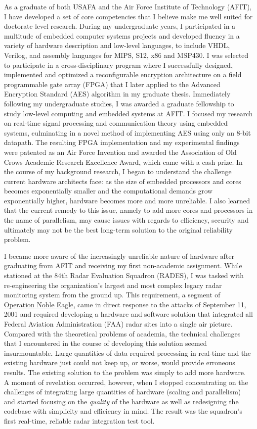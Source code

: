 \documentclass{article}
\begin{document}
As a graduate of both USAFA and the Air Force Institute of Technology
(AFIT), I have developed a set of core competencies that I believe make me well
suited for doctorate level research. During my undergraduate years, I
participated in a multitude of embedded computer systems projects and developed fluency in a
variety of hardware description and low-level languages, to include VHDL,
Verilog, and assembly languages for MIPS, S12, x86 and MSP430. I was
selected to participate in a cross-disciplinary
program where I successfully designed, implemented and optimized a
reconfigurable encryption architecture on a field programmable gate array
(FPGA) that I later applied to the Advanced Encryption Standard (AES) algorithm
in my graduate thesis. Immediately following my undergraduate studies, I was
awarded a graduate fellowship to study low-level computing and embedded systems
at AFIT. I focused my research on real-time
signal processing and communication theory using embedded systems, culminating
in a novel method of implementing AES using only an 8-bit datapath.  The
resulting FPGA implementation and my experimental findings were patented as an Air Force
Invention and awarded the Association of Old Crows Academic Research Excellence
Award, which came with a cash prize. In the course of my background research, I
began to understand the challenge current hardware architects face: as the size
of embedded processors and cores becomes exponentially smaller and the
computational demands grow exponentially higher, hardware becomes more and more 
unreliable. I also learned that the current remedy to this issue, namely to add
more cores and processors in the name of parallelism, may cause issues with
regards to efficiency, security and ultimately may not be the best long-term
solution to the original reliability problem.

I became more aware of the increasingly unreliable nature of hardware after
graduating from AFIT and receiving my first non-academic assignment. While
stationed at the 84th Radar Evaluation Squadron (RADES), I was tasked with
re-engineering the organization's largest and most complex legacy radar
monitoring system from the ground up. This requirement, a segment of
\href{http://en.wikipedia.org/wiki/Operation_Noble_Eagle}{Operation Noble
Eagle}, came in direct response to the attacks of September 11, 2001 and
required developing a hardware and software solution that integrated all
Federal Aviation Administration (FAA) radar sites into a single air picture.
Compared with the theoretical problems of academia, the technical challenges that I
encountered in the course of developing this solution seemed insurmountable.
Large quantities of data required processing in real-time and the existing
hardware just could not keep up, or worse, would provide erroneous results. The
existing solution to the problem was simply to add more hardware. A moment of
revelation occurred, however, when I
stopped concentrating on the challenges of integrating large quantities of hardware (scaling and parallelism) and
started focusing on the \emph{quality} of the hardware as well as redesigning the
codebase with simplicity and efficiency in mind. The result was the squadron's
first real-time, reliable radar integration test tool.
\end{document}
